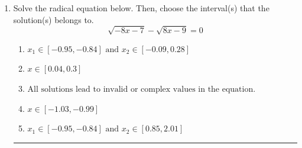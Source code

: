 \documentclass[14pt]{extbook}
\newcommand{\litem}[1]{\item#1\hspace*{-1cm}\rule{\textwidth}{0.4pt}}
\begin{document}
\begin{enumerate}
{\begin{enumerate}[label=\Alph*.]
\end{enumerate} }
\litem{
Solve the radical equation below. Then, choose the interval(s) that the solution(s) belongs to.\[ \sqrt{-8 x - 7} - \sqrt{8 x - 9} = 0 \]\begin{enumerate}[label=\Alph*.]
\item \( x_1 \in [-0.95, -0.84] \text{ and } x_2 \in [-0.09,0.28] \)
\item \( x \in [0.04,0.3] \)
\item \( \text{All solutions lead to invalid or complex values in the equation.} \)
\item \( x \in [-1.03,-0.99] \)
\item \( x_1 \in [-0.95, -0.84] \text{ and } x_2 \in [0.85,2.01] \)

\end{enumerate} }
\end{enumerate}
\end{document}
